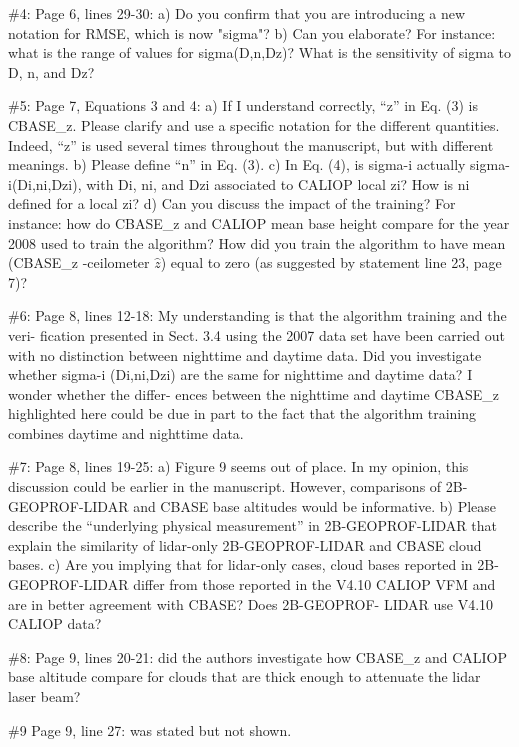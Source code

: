 \documentclass[12pt,a4paper]{responses}
\begin{document}
\#4: Page 6, lines 29-30: a) Do you confirm that you are introducing a new notation for
RMSE, which is now "sigma"? b) Can you elaborate? For instance: what is the range
of values for sigma(D,n,Dz)? What is the sensitivity of sigma to D, n, and Dz?

\#5: Page 7, Equations 3 and 4: a) If I understand correctly, “z” in Eq. (3) is CBASE\_z.
Please clarify and use a specific notation for the different quantities. Indeed, “z” is used
several times throughout the manuscript, but with different meanings. b) Please define
“n” in Eq.  (3).  c) In Eq.  (4), is sigma-i actually sigma-i(Di,ni,Dzi), with Di, ni, and Dzi
associated to CALIOP local zi? How is ni defined for a local zi? d) Can you discuss the
impact of the training? For instance: how do CBASE\_z and CALIOP mean base height
compare for the year 2008 used to train the algorithm? How did you train the algorithm
to have mean (CBASE\_z -ceilometer $\hat{z}$) equal to zero (as suggested by statement
line 23, page 7)?

\#6:  Page 8, lines 12-18:  My understanding is that the algorithm training and the veri-
fication presented in Sect.  3.4 using the 2007 data set have been carried out with no
distinction between nighttime and daytime data.  Did you investigate whether sigma-i
(Di,ni,Dzi) are the same for nighttime and daytime data?  I wonder whether the differ-
ences between the nighttime and daytime CBASE\_z highlighted here could be due in
part to the fact that the algorithm training combines daytime and nighttime data.

\#7: Page 8, lines 19-25: a) Figure 9 seems out of place. In my opinion, this discussion
could be earlier in the manuscript.   However,  comparisons of 2B-GEOPROF-LIDAR
and CBASE base altitudes would be informative.  b) Please describe the “underlying
physical measurement” in 2B-GEOPROF-LIDAR that explain the similarity of lidar-only
2B-GEOPROF-LIDAR and CBASE cloud bases. c) Are you implying that for lidar-only
cases, cloud bases reported in 2B-GEOPROF-LIDAR differ from those reported in the
V4.10 CALIOP VFM and are in better agreement with CBASE? Does 2B-GEOPROF-
LIDAR use V4.10 CALIOP data?

\#8: Page 9, lines 20-21: did the authors investigate how CBASE\_z and CALIOP base
altitude compare for clouds that are thick enough to attenuate the lidar laser beam?

\#9 Page 9, line 27: was stated but not shown.

\textit{}
\end{document}
